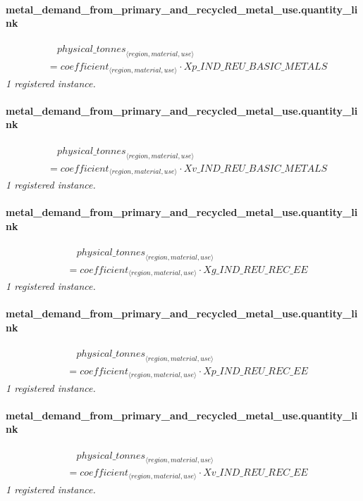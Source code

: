 \documentclass[11pt]{article}
\begin{document}
\paragraph{metal\_demand\_from\_primary\_and\_recycled\_metal\_use.quantity\_link}
\begin{align*}
&\quad {physical\_tonnes}_{\langle region, material, use\rangle}\\
&= coefficient_{\langle region, material, use\rangle} \cdot Xp\_IND\_REU\_BASIC\_METALS
\end{align*}
\noindent\emph{1 registered instance.}\par
\paragraph{metal\_demand\_from\_primary\_and\_recycled\_metal\_use.quantity\_link}
\begin{align*}
&\quad {physical\_tonnes}_{\langle region, material, use\rangle}\\
&= coefficient_{\langle region, material, use\rangle} \cdot Xv\_IND\_REU\_BASIC\_METALS
\end{align*}
\noindent\emph{1 registered instance.}\par
\paragraph{metal\_demand\_from\_primary\_and\_recycled\_metal\_use.quantity\_link}
\begin{align*}
&\quad {physical\_tonnes}_{\langle region, material, use\rangle}\\
&= coefficient_{\langle region, material, use\rangle} \cdot Xg\_IND\_REU\_REC\_EE
\end{align*}
\noindent\emph{1 registered instance.}\par
\paragraph{metal\_demand\_from\_primary\_and\_recycled\_metal\_use.quantity\_link}
\begin{align*}
&\quad {physical\_tonnes}_{\langle region, material, use\rangle}\\
&= coefficient_{\langle region, material, use\rangle} \cdot Xp\_IND\_REU\_REC\_EE
\end{align*}
\noindent\emph{1 registered instance.}\par
\paragraph{metal\_demand\_from\_primary\_and\_recycled\_metal\_use.quantity\_link}
\begin{align*}
&\quad {physical\_tonnes}_{\langle region, material, use\rangle}\\
&= coefficient_{\langle region, material, use\rangle} \cdot Xv\_IND\_REU\_REC\_EE
\end{align*}
\noindent\emph{1 registered instance.}\par
\end{document}
